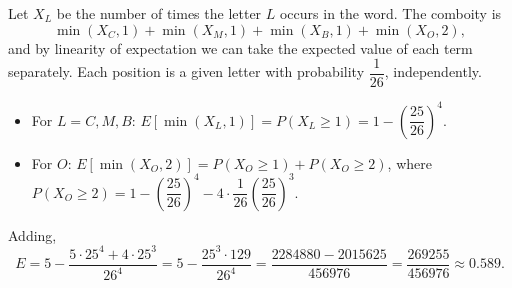 Let $X_L$ be the number of times the letter $L$ occurs in the word. The comboity is
\[
\min(X_C,1)+\min(X_M,1)+\min(X_B,1)+\min(X_O,2),
\]
and by linearity of expectation we can take the expected value of each term separately. Each position is a given letter with probability $\dfrac{1}{26}$, independently.
\begin{itemize}
\item For $L=C,M,B$: $E[\min(X_L,1)]=P(X_L\ge1)=1-\left(\dfrac{25}{26}\right)^4$.
\item For $O$: $E[\min(X_O,2)]=P(X_O\ge1)+P(X_O\ge2)$, where $P(X_O\ge2)=1-\left(\dfrac{25}{26}\right)^4-4\cdot\dfrac{1}{26}\left(\dfrac{25}{26}\right)^3$.
\end{itemize}
Adding,
\[
E=5-\dfrac{5\cdot25^4+4\cdot25^3}{26^4}=5-\dfrac{25^3\cdot129}{26^4}=\dfrac{2284880-2015625}{456976}=\boxed{\dfrac{269255}{456976}}\approx0.589 .
\]
